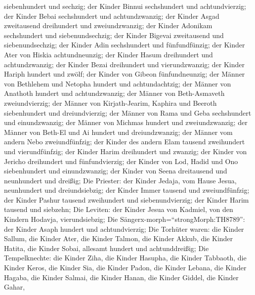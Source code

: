 siebenhundert und sechzig;  der Kinder Binnui sechshundert
und achtundvierzig;  der Kinder Bebai sechshundert und
achtundzwanzig;  der Kinder Asgad zweitausend dreihundert
und zweiundzwanzig;  der Kinder Adonikam sechshundert und
siebenundsechzig;  der Kinder Bigevai zweitausend und
siebenundsechzig;  der Kinder Adin sechshundert und
fünfundfünzig;  der Kinder Ater von Hiskia achtundneunzig;
 der Kinder Hasum dreihundert und achtundzwanzig;
 der Kinder Bezai dreihundert und vierundzwanzig;
 der Kinder Hariph hundert und zwölf;  der
Kinder von Gibeon fünfundneunzig;  der Männer von Bethlehem
und Netopha hundert und achtundachtzig;  der Männer von
Anathoth hundert und achtundzwanzig;  der Männer von
Beth-Asmaveth zweiundvierzig;  der Männer von
Kirjath-Jearim, Kaphira und Beeroth siebenhundert und dreiundvierzig;
 der Männer von Rama und Geba sechshundert und
einundzwanzig;  der Männer von Michmas hundert und
zweiundzwanzig;  der Männer von Beth-El und Ai hundert und
dreiundzwanzig;  der Männer vom andern Nebo zweiundfünfzig;
 der Kinder des andern Elam tausend zweihundert und
vierundfünfzig;  der Kinder Harim dreihundert und zwanzig;
 der Kinder von Jericho dreihundert und fünfundvierzig;
 der Kinder von Lod, Hadid und Ono siebenhundert und
einundzwanzig;  der Kinder von Seena dreitausend und
neunhundert und dreißig;  Die Priester: der Kinder Jedaja,
vom Hause Jesua, neunhundert und dreiundsiebzig;  der
Kinder Immer tausend und zweiundfünfzig;  der Kinder Pashur
tausend zweihundert und siebenundvierzig;  der Kinder Harim
tausend und siebzehn;  Die Leviten: der Kinder Jesua von
Kadmiel, von den Kindern Hodavja, vierundsiebzig;  Die
Sängerx-morph=``strongMorph:TH8789'': der Kinder Asaph hundert und
achtundvierzig;  Die Torhüter waren: die Kinder Sallum, die
Kinder Ater, die Kinder Talmon, die Kinder Akkub, die Kinder Hatita, die
Kinder Sobai, allesamt hundert und achtunddreißig;  Die
Tempelknechte: die Kinder Ziha, die Kinder Hasupha, die Kinder Tabbaoth,
 die Kinder Keros, die Kinder Sia, die Kinder Padon,
 die Kinder Lebana, die Kinder Hagaba, die Kinder Salmai,
 die Kinder Hanan, die Kinder Giddel, die Kinder Gahar,
